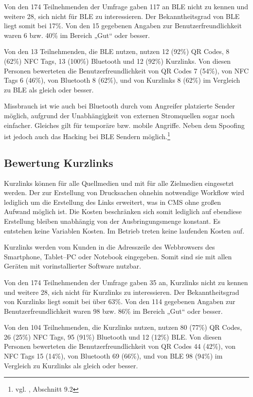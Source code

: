 Von den 174 Teilnehmenden der Umfrage gaben 117 an \ac{BLE} nicht zu kennen und weitere 28, sich nicht für \ac{BLE} zu interessieren. Der Bekanntheitsgrad von \ac{BLE} liegt somit bei 17\%. Von den 15 gegebenen Angaben zur Benutzerfreundlichkeit waren 6 bzw. 40\% im Bereich „Gut“ oder besser.

Von den 13 Teilnehmenden, die \ac{BLE} nutzen, nutzen 12 (92\%) QR Codes, 8 (62\%) NFC Tags, 13 (100\%) Bluetooth und 12 (92\%) Kurzlinks. Von diesen Personen bewerteten die  Benutzerfreundlichkeit von QR Codes 7 (54\%), von NFC Tags 6 (46\%), von Bluetooth 8 (62\%), und von Kurzlinks 8 (62\%) im Vergleich zu \ac{BLE} als gleich oder besser.

Missbrauch ist wie auch bei Bluetooth durch vom Angreifer platzierte Sender möglich, aufgrund der Unabhängigkeit von externen Stromquellen sogar noch einfacher. Gleiches gilt für temporäre bzw. mobile Angriffe. Neben dem Spoofing ist jedoch auch das Hacking bei BLE Sendern möglich.\footnote{vgl. \cite{gilchrist}, Abschnitt 9.2} 

\subsection{Bewertung Kurzlinks} %
\label{sub:bewertung_kurzlinks}
Kurzlinks können für alle Quellmedien und mit für alle Zielmedien eingesetzt werden. Der zur Erstellung von Drucksachen ohnehin notwendige Workflow wird lediglich um die Erstellung des Links erweitert, was in \ac{CMS} ohne großen Aufwand möglich ist. Die Kosten beschränken sich somit lediglich auf ebendiese Erstellung bleiben unabhängig von der Ausbringungsmenge konstant. Es entstehen keine Variablen Kosten. Im Betrieb treten keine laufenden Kosten auf.

Kurzlinks werden vom Kunden in die Adresszeile des Webbrowsers des Smartphone, Tablet–PC oder Notebook eingegeben. Somit sind sie mit allen Geräten mit vorinstallierter Software nutzbar. 

Von den 174 Teilnehmenden der Umfrage gaben 35 an, Kurzlinks nicht zu kennen und weitere 28, sich nicht für Kurzlinks zu interessieren. Der Bekanntheitsgrad von Kurzlinks liegt somit bei über 63\%. Von den 114 gegebenen Angaben zur Benutzerfreundlichkeit waren 98 bzw. 86\% im Bereich „Gut“ oder besser. 

Von den 104 Teilnehmenden, die Kurzlinks nutzen, nutzen 80 (77\%) QR Codes, 26 (25\%) NFC Tags, 95 (91\%) Bluetooth und 12 (12\%) \ac{BLE}. Von diesen Personen bewerteten die  Benutzerfreundlichkeit von QR Codes 44 (42\%), von NFC Tags 15 (14\%), von Bluetooth 69 (66\%), und von \ac{BLE} 98 (94\%) im Vergleich zu Kurzlinks als gleich oder besser.

